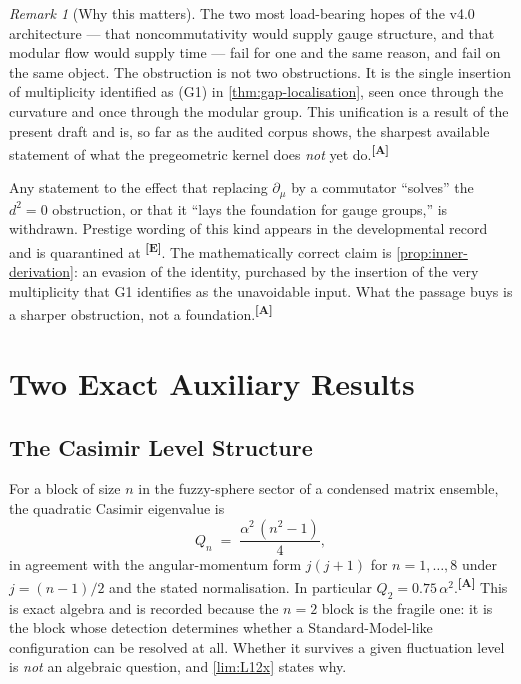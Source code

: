 \documentclass[12pt,a4paper,twoside]{article}
\theoremstyle{plain}
\theoremstyle{definition}
\theoremstyle{remark}
\newtheorem{remark}[theorem]{Remark}
\newcommand{\catmark}[1]{\textsuperscript{\textsf{\textbf{[#1]}}}}
\begin{document}
\begin{remark}[Why this matters]
\label{rem:one-obstruction}
The two most load-bearing hopes of the v4.0 architecture --- that
noncommutativity would supply gauge structure, and that modular flow
would supply time --- fail for one and the same reason, and fail on the
same object. The obstruction is not two obstructions. It is the single
insertion of multiplicity identified as (G1) in
\cref{thm:gap-localisation}, seen once through the curvature and once
through the modular group. This unification is a result of the present
draft and is, so far as the audited corpus shows, the sharpest available
statement of what the pregeometric kernel does \emph{not} yet
do.\catmark{A}
\end{remark}

\begin{governancebox}
Any statement to the effect that replacing $\partial_\mu$ by a
commutator ``solves'' the $d^2 = 0$ obstruction, or that it ``lays the
foundation for gauge groups,'' is withdrawn. Prestige wording of this
kind appears in the developmental record and is quarantined at
\catmark{E}. The mathematically correct claim is
\cref{prop:inner-derivation}: an evasion of the identity, purchased by
the insertion of the very multiplicity that G1 identifies as the
unavoidable input. What the passage buys is a sharper obstruction, not a
foundation.\catmark{A}
\end{governancebox}

\newpage
\section{Two Exact Auxiliary Results}
\label{sec:auxiliary-exact}

\subsection{The Casimir Level Structure}
\label{subsec:casimir-levels}

For a block of size $n$ in the fuzzy-sphere sector of a condensed matrix
ensemble, the quadratic Casimir eigenvalue is
\begin{equation}
 Q_n \;=\; \frac{\alpha^2\,(n^2-1)}{4},
 \label{eq:casimir}
\end{equation}
in agreement with the angular-momentum form $j(j+1)$ for $n = 1,\ldots,8$
under $j = (n-1)/2$ and the stated normalisation. In particular
$Q_2 = 0.75\,\alpha^2$.\catmark{A} This is exact algebra and is recorded
because the $n=2$ block is the fragile one: it is the block whose
detection determines whether a Standard-Model-like configuration can be
resolved at all. Whether it survives a given fluctuation level is
\emph{not} an algebraic question, and \cref{lim:L12x} states why.
\end{document}
